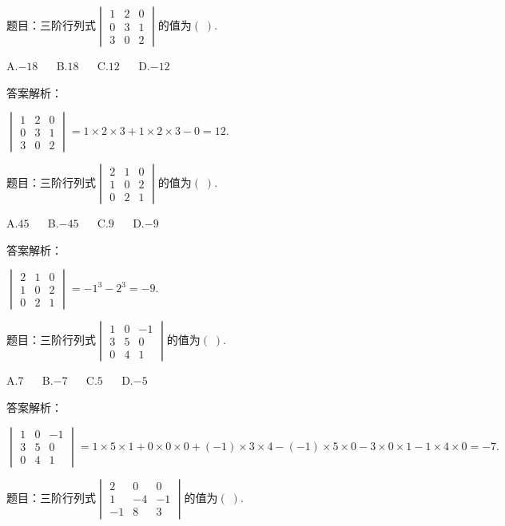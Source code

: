 题目：$\mathrm{三阶行列式}\begin{vmatrix}1&2&0\\0&3&1\\3&0&2\end{vmatrix}\mathrm{的值为}(\;).$

A.$-18$ $\quad$ B.$18$ $\quad$ C.$12$ $\quad$ D.$-12$

答案解析：

$\begin{vmatrix}1&2&0\\0&3&1\\3&0&2\end{vmatrix}=1\times2\times3+1\times2\times3-0=12.$



题目：$\mathrm{三阶行列式}\begin{vmatrix}2&1&0\\1&0&2\\0&2&1\end{vmatrix}\mathrm{的值为}(\;).$

A.$45$ $\quad$ B.$-45$ $\quad$ C.$9$ $\quad$ D.$-9$

答案解析：

$\begin{vmatrix}2&1&0\\1&0&2\\0&2&1\end{vmatrix}=-1^3-2^3=-9.$



题目：$\mathrm{三阶行列式}\begin{vmatrix}1&0&-1\\3&5&0\\0&4&1\end{vmatrix}\mathrm{的值为}(\;).$

A.$7$ $\quad$ B.$-7$ $\quad$ C.$5$ $\quad$ D.$-5$

答案解析：

$\begin{vmatrix}1&0&-1\\3&5&0\\0&4&1\end{vmatrix}=1\times5\times1+0\times0\times0+(-1)\times3\times4-(-1)\times5\times0-3\times0\times1-1\times4\times0=-7.$



题目：$\mathrm{三阶行列式}\begin{vmatrix}2&0&0\\1&-4&-1\\-1&8&3\end{vmatrix}\mathrm{的值为}(\;).$

